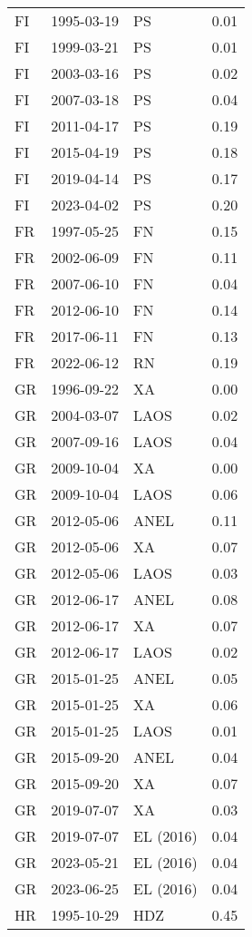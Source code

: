 \begin{longtable}{lllr}
  FI & 1995-03-19 & PS & 0.01 \\ 
  FI & 1999-03-21 & PS & 0.01 \\ 
  FI & 2003-03-16 & PS & 0.02 \\ 
  FI & 2007-03-18 & PS & 0.04 \\ 
  FI & 2011-04-17 & PS & 0.19 \\ 
  FI & 2015-04-19 & PS & 0.18 \\ 
  FI & 2019-04-14 & PS & 0.17 \\ 
  FI & 2023-04-02 & PS & 0.20 \\ 
  FR & 1997-05-25 & FN & 0.15 \\ 
  FR & 2002-06-09 & FN & 0.11 \\ 
  FR & 2007-06-10 & FN & 0.04 \\ 
  FR & 2012-06-10 & FN & 0.14 \\ 
  FR & 2017-06-11 & FN & 0.13 \\ 
  FR & 2022-06-12 & RN & 0.19 \\ 
  GR & 1996-09-22 & XA & 0.00 \\ 
  GR & 2004-03-07 & LAOS & 0.02 \\ 
  GR & 2007-09-16 & LAOS & 0.04 \\ 
  GR & 2009-10-04 & XA & 0.00 \\ 
  GR & 2009-10-04 & LAOS & 0.06 \\ 
  GR & 2012-05-06 & ANEL & 0.11 \\ 
  GR & 2012-05-06 & XA & 0.07 \\ 
  GR & 2012-05-06 & LAOS & 0.03 \\ 
  GR & 2012-06-17 & ANEL & 0.08 \\ 
  GR & 2012-06-17 & XA & 0.07 \\ 
  GR & 2012-06-17 & LAOS & 0.02 \\ 
  GR & 2015-01-25 & ANEL & 0.05 \\ 
  GR & 2015-01-25 & XA & 0.06 \\ 
  GR & 2015-01-25 & LAOS & 0.01 \\ 
  GR & 2015-09-20 & ANEL & 0.04 \\ 
  GR & 2015-09-20 & XA & 0.07 \\ 
  GR & 2019-07-07 & XA & 0.03 \\ 
  GR & 2019-07-07 & EL (2016) & 0.04 \\ 
  GR & 2023-05-21 & EL (2016) & 0.04 \\ 
  GR & 2023-06-25 & EL (2016) & 0.04 \\ 
  HR & 1995-10-29 & HDZ & 0.45 \\ 

\end{longtable}
